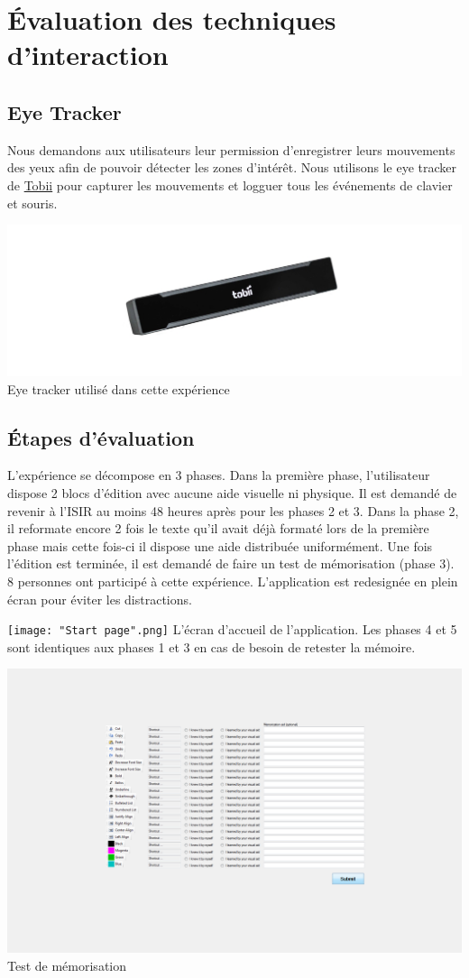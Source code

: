 \documentclass[12pt,a4paper]{article}
\begin{document}
\section{Évaluation des techniques d'interaction}
\subsection{Eye Tracker}
Nous demandons aux utilisateurs leur permission d'enregistrer leurs mouvements des yeux afin de pouvoir détecter les zones d'intérêt. Nous utilisons le eye tracker de \href{https://www.tobii.com/}{Tobii} pour capturer les mouvements et logguer tous les événements de clavier et souris. 
\begin{center}
	\includegraphics[width=1\linewidth]{Tobii.jpg}
	Eye tracker utilisé dans cette expérience
\end{center}
\subsection{Étapes d'évaluation}
L'expérience se décompose en 3 phases. Dans la première phase, l'utilisateur dispose 2 blocs d'édition avec aucune aide visuelle ni physique. Il est demandé de revenir à l'ISIR au moins 48 heures après pour les phases 2 et 3. Dans la phase 2, il reformate encore 2 fois le texte qu'il avait déjà formaté lors de la première phase mais cette fois-ci il dispose une aide distribuée uniformément. Une fois l'édition est terminée, il est demandé de faire un test de mémorisation (phase 3). 8 personnes ont participé à cette expérience. L'application est redesignée en plein écran pour éviter les distractions.
\begin{center}
	\texttt{[image: "Start page".png]}
	L'écran d'accueil de l'application. Les phases 4 et 5 sont identiques aux phases 1 et 3 en cas de besoin de retester la mémoire.
\end{center}
\begin{center}
	\includegraphics[width=1\linewidth]{Memo.png}
	Test de mémorisation
\end{center}
\end{document}
